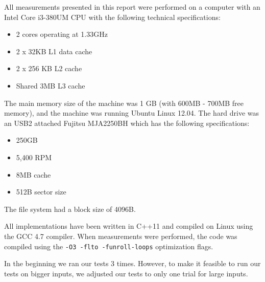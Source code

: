 All measurements presented in this report were performed on a computer
with an Intel Core i3-380UM CPU with the following technical
specifications:
\begin{itemize}
\item 2 cores operating at 1.33GHz
\item 2 x 32KB L1 data cache
\item 2 x 256 KB L2 cache
\item Shared 3MB L3 cache
\end{itemize}
The main memory size of the machine was 1 GB (with 600MB - 700MB free memory), and the machine was running Ubuntu
Linux 12.04. The hard drive was an USB2 attached Fujitsu MJA2250BH which has the following specifications:

\begin{itemize}
\item 250GB
\item 5,400 RPM
\item 8MB cache
\item 512B sector size
\end{itemize}

The file system had a block size of 4096B.

All implementations have been
written in C++11 and compiled on Linux using the GCC 4.7 compiler. When measurements were performed, the
code was compiled using the \texttt{-O3 -flto -funroll-loops}
optimization flags.

In the beginning we ran our tests 3 times. However, to make it feasible
to run our tests on bigger inputs, we adjusted our tests to only
one trial for large inputs.